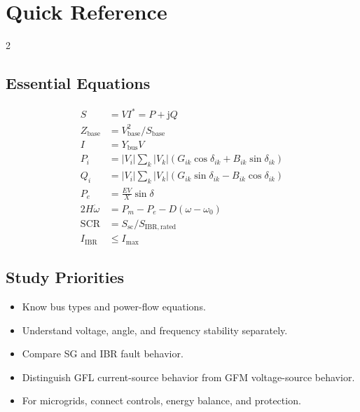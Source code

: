 \documentclass[11pt]{article}
\newcommand{\junit}{\mathrm{j}}
\begin{document}
\section{Quick Reference}

\begin{multicols}{2}
\subsection*{Essential Equations}
\begin{align*}
S &= VI^* = P+\junit Q\\
Z_{\mathrm{base}} &= V_{\mathrm{base}}^2/S_{\mathrm{base}}\\
I &= Y_{\mathrm{bus}}V\\
P_i &= |V_i|\sum_k |V_k|(G_{ik}\cos\delta_{ik}+B_{ik}\sin\delta_{ik})\\
Q_i &= |V_i|\sum_k |V_k|(G_{ik}\sin\delta_{ik}-B_{ik}\cos\delta_{ik})\\
P_e &= \frac{EV}{X}\sin\delta\\
2H\dot{\omega} &= P_m-P_e-D(\omega-\omega_0)\\
\mathrm{SCR} &= S_{\mathrm{sc}}/S_{\mathrm{IBR,rated}}\\
I_{\mathrm{IBR}} &\le I_{\max}
\end{align*}

\subsection*{Study Priorities}
\begin{itemize}[leftmargin=*]
  \item Know bus types and power-flow equations.
  \item Understand voltage, angle, and frequency stability separately.
  \item Compare SG and IBR fault behavior.
  \item Distinguish GFL current-source behavior from GFM voltage-source behavior.
  \item For microgrids, connect controls, energy balance, and protection.
\end{itemize}
\end{multicols}
\end{document}
